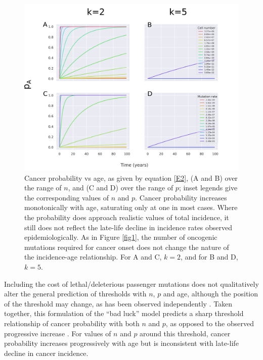 \documentclass[10pt,twocolumn,twoside]{article}
\begin{document}
\begin{figure}[tbhp]
	\centering
	\includegraphics[width=\linewidth]{fig2.png}
	\caption{Cancer probability vs age, as given by equation \ref{E2}, (A and B) over the range of $n$, and (C and D) over the range of $p$; inset legends give the corresponding values of $n$ and $p$. Cancer probability increases monotonically with age, saturating only at one in most cases. Where the probability does approach realistic values of total incidence, it still does not reflect the late-life decline in incidence rates observed epidemiologically. As in Figure \ref{fig1}, the number of oncogenic mutations required for cancer onset does not change the nature of the incidence-age relationship. For A and C, $k=2$, and for B and D, $k=5$.}
	\label{fig2}
\end{figure}

Including the cost of lethal/deleterious passenger mutations does not qualitatively alter the general prediction of thresholds with $n$, $p$ and age, although the position of the threshold may change, as has been observed independently \cite{McFarland2013}. Taken together, this formulation of the ``bad luck'' model predicts a sharp threshold relationship of cancer probability with both $n$ and $p$, as opposed to the observed progressive increase \cite{Tomasetti78, Tomasetti2017}. For values of $n$ and $p$ around this threshold, cancer probability increases progressively with age but is inconsistent with late-life decline in cancer incidence. 
\end{document}
